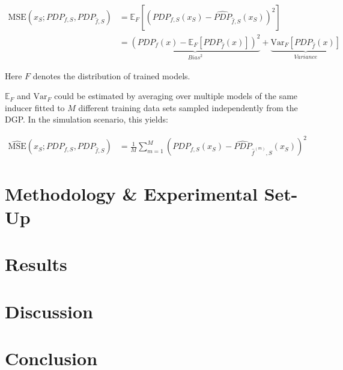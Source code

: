 \documentclass[runningheads]{llncs}
\begin{document}
\begin{align}
    \text{MSE}(x_S; PDP_{f,S}, PDP_{\hat f,S})
    &= \mathbb{E}_F[{(PDP_{f,S}(x_S) - \widehat{PDP}_{\hat f,S}(x_S))}^2]\\
    &= \underbrace{{(PDP_f(x) - \mathbb{E}_F[PDP_{\hat{f}}(x)])}^2}_{Bias^2} + \underbrace{\text{Var}_F[PDP_{\hat{f}}(x)]}_{Variance}
\end{align}

\noindent Here $F$ denotes the distribution of trained models.



$\mathbb{E}_F$ and $\text{Var}_F$ could be estimated by averaging over
multiple models of the same inducer fitted to $M$ different training data
sets sampled independently from the DGP. In the simulation scenario, this yields:

\begin{align}
    \widehat{\text{MSE}}(x_S; PDP_{f,S}, PDP_{\hat f,S}) &= \frac{1}{M} \sum_{m=1}^{M} {(PDP_{f,S}(x_S) - \widehat{PDP}_{\hat f^{(m)},S}(x_S))}^2
\end{align}







\section{Methodology \& Experimental Set-Up}\label{sec:methodology-set-up}

\section{Results}\label{sec:results}

\section{Discussion}\label{sec:discussion}

\section{Conclusion}\label{sec:conclusion}


\end{document}
